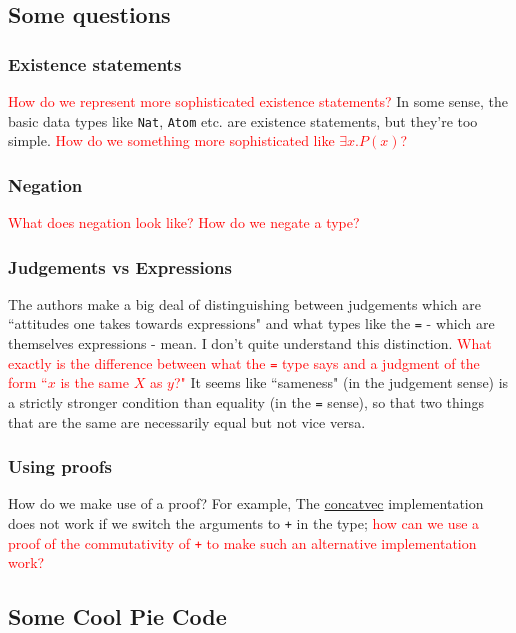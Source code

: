 \documentclass{article}
\newcommand{\ttt}[1]{\texttt{#1}}
\begin{document}
\subsection{Some questions}
\subsubsection*{Existence statements}
\textcolor{red}{How do we represent more sophisticated existence statements?} In some sense, the basic data types like \ttt{Nat}, \ttt{Atom} etc. are existence statements, but they're too simple. \textcolor{red}{How do we something more sophisticated like \(\exists x. P(x)\)?} 
\subsubsection*{Negation}
\textcolor{red}{What does negation look like? How do we negate a type?}
\subsubsection*{Judgements vs Expressions}
The authors make a big deal of distinguishing between judgements which are ``attitudes one takes towards expressions" and what types like the \ttt{=} - which are themselves expressions - mean. I don't quite understand this distinction. \textcolor{red}{What exactly is the difference between what the \ttt{=} type says and a judgment of the form ``\(x\) is the same \(X\) as \(y\)?"} It seems like ``sameness" (in the judgement sense) is a strictly stronger condition than equality (in the \ttt{=} sense), so that two things that are the same are necessarily equal but not vice versa.
\subsubsection*{Using proofs}
How do we make use of a proof? For example, The \hyperref[code:concatvec]{concatvec} implementation does not work if we switch the arguments to \ttt{+} in the type; \textcolor{red}{how can we use a proof of the commutativity of \ttt{+} to make such an alternative implementation work?}
\newpage
\begin{appendix}
\section{Some Cool Pie Code} \label{pie-code-appendix}
\renewcommand{\contentsname}{\normalsize Contents}
\localtableofcontents
\newpage\noindent

\end{appendix}
\end{document}
